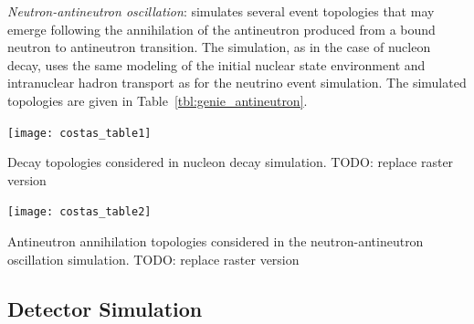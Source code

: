 \textit{Neutron-antineutron oscillation}:  simulates several event topologies that may emerge following the annihilation of the antineutron produced from a bound neutron to antineutron transition. The simulation, as in the case of nucleon decay, uses the same modeling of 
 the initial nuclear state environment and intranuclear hadron transport as for the neutrino event simulation. The simulated topologies are given in Table~\ref{tbl:genie_antineutron}.

\begin{table}
  \texttt{[image: costas\_table1]}
  
  \caption[ nucleon decay topologies]{Decay topologies considered in  nucleon decay simulation. TODO: replace raster version}
  \label{tbl:genie_ndk}
\end{table}

\begin{table}
	\begin{centering}
		\texttt{[image: costas\_table2]}\\
    \end{centering}
  
  \caption[ antineutron annihilation topologies]{Antineutron annihilation topologies considered in the  neutron-antineutron oscillation simulation. TODO: replace raster version}
  \label{tbl:genie_antineutron}
\end{table}

\subsection{Detector Simulation}
\label{sec:tools-mc-detsim}


